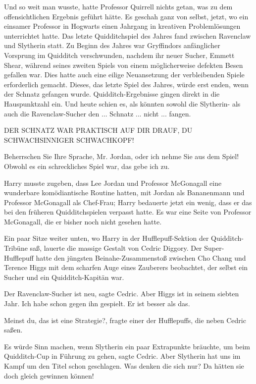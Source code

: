 Und so weit man wusste, hatte Professor Quirrell nichts getan, was zu dem
offensichtlichen Ergebnis geführt hätte. Es geschah ganz von selbst, jetzt, wo
ein einsamer Professor in Hogwarts einen Jahrgang in kreativen Problemlösungen
unterrichtet hatte. Das letzte Quidditchspiel des Jahres fand zwischen Ravenclaw
und Slytherin statt. Zu Beginn des Jahres war Gryffindors anfänglicher Vorsprung
im Quidditch verschwunden, nachdem ihr neuer Sucher, Emmett Shear, während
seines zweiten Spiels von einem möglicherweise defekten Besen gefallen war. Dies
hatte auch eine eilige Neuansetzung der verbleibenden Spiele erforderlich
gemacht. Dieses, das letzte Spiel des Jahres, würde erst enden, wenn der Schnatz
gefangen wurde. Quidditch-Ergebnisse gingen direkt in die Hauspunktzahl ein. Und
heute schien es, als könnten sowohl die Slytherin- als auch die Ravenclaw-Sucher
den ... Schnatz ... nicht ... fangen.

\glqq{}DER SCHNATZ WAR PRAKTISCH AUF DIR DRAUF, DU SCHWACHSINNIGER SCHWACHKOPF!\grqq{}

\glqq{}Beherrschen Sie Ihre Sprache, Mr. Jordan, oder ich nehme Sie aus dem
Spiel! Obwohl es ein schreckliches Spiel war, das gebe ich zu.\grqq{}

Harry musste zugeben, dass Lee Jordan und Professor McGonagall eine wunderbare
komödiantische Routine hatten, mit Jordan als Bananenmann und Professor
McGonagall als Chef-Frau; Harry bedauerte jetzt ein wenig, dass er das bei den
früheren Quidditchspielen verpasst hatte. Es war eine Seite von Professor
McGonagall, die er bisher noch nicht gesehen hatte.

Ein paar Sitze weiter unten, wo Harry in der Hufflepuff-Sektion der
Quidditch-Tribüne saß, lauerte die massige Gestalt von Cedric Diggory. Der
Super-Hufflepuff hatte den jüngsten Beinahe-Zusammenstoß zwischen Cho Chang und
Terence Higgs mit dem scharfen Auge eines Zauberers beobachtet, der selbst ein
Sucher und ein Quidditch-Kapitän war.

\glqq{}Der Ravenclaw-Sucher ist neu\grqq{}, sagte Cedric. \glqq{}Aber Higgs ist in
seinem siebten Jahr. Ich habe schon gegen ihn gespielt. Er ist besser als das.\grqq{}

\glqq{}Meinst du, das ist eine Strategie?\grqq{}, fragte einer der Hufflepuffs,
die neben Cedric saßen.

\glqq{}Es würde Sinn machen, wenn Slytherin ein paar Extrapunkte bräuchte, um
beim Quidditch-Cup in Führung zu gehen\grqq{}, sagte Cedric. \glqq{}Aber
Slytherin hat uns im Kampf um den Titel schon geschlagen. Was denken die sich
nur? Da hätten sie doch gleich gewinnen können!\grqq{}

